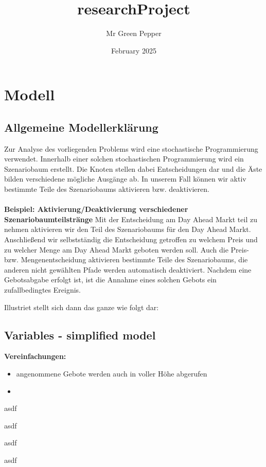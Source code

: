 \documentclass{article}
\title{researchProject}
\author{Mr Green Pepper}
\date{February 2025}
\begin{document}
\doublespacing
\maketitle
\section{Modell}
\subsection{Allgemeine Modellerklärung}
Zur Analyse des vorliegenden Problems wird eine stochastische Programmierung verwendet. Innerhalb einer solchen stochastischen Programmierung wird ein Szenariobaum erstellt. Die Knoten stellen dabei Entscheidungen dar und die Äste bilden verschiedene mögliche Ausgänge ab. In unserem Fall können wir aktiv bestimmte Teile des Szenariobaums aktivieren bzw. deaktivieren.
\\
\\
\textbf{Beispiel: Aktivierung/Deaktivierung verschiedener Szenariobaumteilstränge}
Mit der Entscheidung am Day Ahead Markt teil zu nehmen aktivieren wir den Teil des Szenariobaums für den Day Ahead Markt. Anschließend wir selbstständig die Entscheidung getroffen zu welchem Preis und zu welcher Menge am Day Ahead Markt geboten werden soll. Auch die Preis- bzw. Mengenentscheidung aktivieren bestimmte Teile des Szenariobaums, die anderen nicht gewählten Pfade werden automatisch deaktiviert. Nachdem eine Gebotsabgabe erfolgt ist, ist die Annahme eines solchen Gebots ein zufallbedingtes Ereignis.

Illustriet stellt sich dann das ganze wie folgt dar:
\subsection{Variables - simplified model}
\textbf{Vereinfachungen:}
\begin{itemize}
    \item angenommene Gebote werden auch in voller Höhe abgerufen
    \item 
\end{itemize}

asdf


asdf


asdf


asdf
\end{document}
